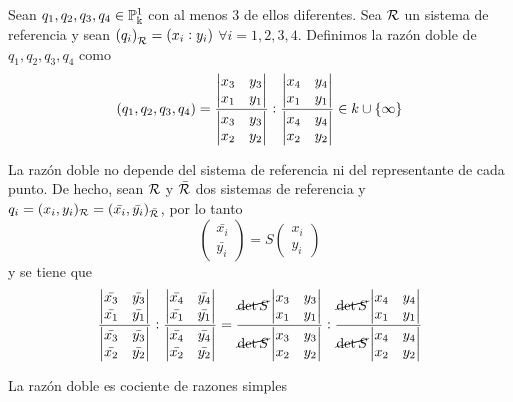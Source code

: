 \begin{defi}
  Sean $q_1, q_2, q_3, q_4 \in \mathbb{P}^1_\Bbbk$ con al menos 3 de ellos diferentes. Sea
  $\mathcal{R}$ un sistema de referencia y sean $\left( q_i \right)_{\mathcal{R}} = (x_i:y_i)$
  $\forall i=1,2,3,4$. Definimos la razón doble de $q_1,q_2,q_3,q_4$ como
  \[
    \left( q_1,q_2,q_3,q_4 \right) = \frac{\begin{vmatrix}x_3 & y_3 \\ x_1 & y_1\end{vmatrix}}
    {\begin{vmatrix}x_3 & y_3 \\ x_2 & y_2\end{vmatrix}}:\frac{\begin{vmatrix}x_4 & y_4 \\ x_1 & y_1\end{vmatrix}}
    {\begin{vmatrix}x_4 & y_4 \\ x_2 & y_2\end{vmatrix}} \in k \cup \left\{\infty\right\}
  \]
\end{defi}
\begin{obs}
  La razón doble no depende del sistema de referencia ni del representante
  de cada punto. De hecho, sean $\mathcal{R}$ y $\bar{\mathcal{R}}$ dos sistemas de referencia
  y $q_i = (x_i, y_i)_{\mathcal{R}} = (\bar{x_i}, \bar{y_i})_{\bar{\mathcal{R}}}$, por lo tanto
  \[
    \begin{pmatrix} \bar{x_i} \\ \bar{y_i} \end{pmatrix} = S \begin{pmatrix}
      x_i \\ y_i \end{pmatrix}
  \]
  y se tiene que
  \[
    \frac{\begin{vmatrix}\bar{x_3} & \bar{y_3} \\ \bar{x_1} & \bar{y_1}\end{vmatrix}}
    {\begin{vmatrix}\bar{x_3} & \bar{y_3} \\ \bar{x_2} & \bar{y_2}\end{vmatrix}}:
    \frac{\begin{vmatrix}\bar{x_4} & \bar{y_4} \\ \bar{x_1} & \bar{y_1}\end{vmatrix}}
    {\begin{vmatrix}\bar{x_4} & \bar{y_4} \\ \bar{x_2} & \bar{y_2}\end{vmatrix}}
    =
    \frac{\cancel{\det S}\begin{vmatrix}x_3 & y_3 \\ x_1 & y_1\end{vmatrix}}
    {\cancel{\det S} \begin{vmatrix}x_3 & y_3 \\ x_2 & y_2\end{vmatrix}}:
    \frac{\cancel{\det S} \begin{vmatrix}x_4 & y_4 \\ x_1 & y_1\end{vmatrix}}
    {\cancel{\det S} \begin{vmatrix}x_4 & y_4 \\ x_2 & y_2\end{vmatrix}}
  \]
\end{obs}
\begin{obs}
  La razón doble es cociente de razones simples
\end{obs}
